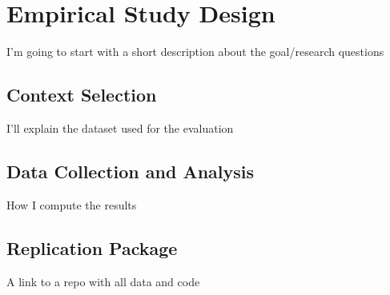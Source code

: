 \chapter{Empirical Study Design}

I'm going to start with a short description  about the goal/research questions

\section{Context Selection}
I'll explain the dataset used for the evaluation


\section{Data Collection and Analysis}
How I compute the results


\section{Replication Package}
A link to a repo with all data and code

